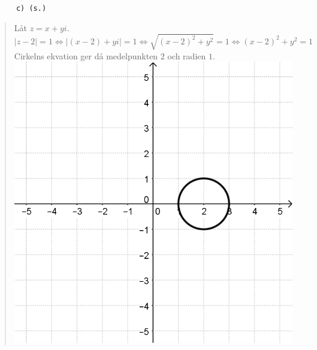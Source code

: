 \documentclass[a4paper]{article}
\newcommand{\tskcol}[1]{\textcolor{tskcol}{#1}}
\begin{document}
	\texttt{\tskcol{~~~~~~c) (s.)}}
	\begin{quotation}
		\noindent
		Låt $z=x+yi$.
		\[|z-2|=1 \Leftrightarrow
		|(x-2)+yi|=1 \Leftrightarrow
		\sqrt{(x-2)^2+y^2}=1 \Leftrightarrow
		(x-2)^2+y^2=1\]
		Cirkelns ekvation ger då medelpunkten $2$ och radien $1$. \\
		\includegraphics[scale=0.2]{images/612c.PNG}
	\end{quotation}
	
\end{document}
